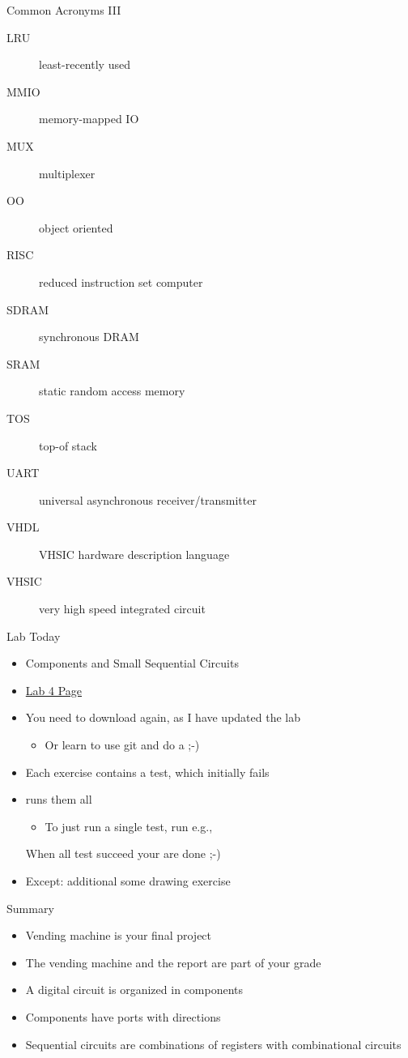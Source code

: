 \begin{frame}[fragile]{Common Acronyms III}
\begin{description}
\item [LRU] least-recently used
\item [MMIO] memory-mapped IO
\item [MUX] multiplexer
\item [OO] object oriented
\item [RISC] reduced instruction set computer
\item [SDRAM] synchronous DRAM
\item [SRAM] static random access memory
\item [TOS] top-of stack
\item [UART] universal asynchronous receiver/transmitter
\item [VHDL] VHSIC hardware description language
\item [VHSIC] very high speed integrated circuit
\end{description}
\end{frame}


\begin{frame}[fragile]{Lab Today}
\begin{itemize}
\item Components and Small Sequential Circuits
\item \href{https://github.com/schoeberl/chisel-lab/tree/master/lab4}{Lab 4 Page}
\item You need to download again, as I have updated the lab
\begin{itemize}
\item Or learn to use git and do a   ;-)
\end{itemize}
\item Each exercise contains a test, which initially fails
\item {} runs them all
\begin{itemize}
\item To just run a single test, run e.g.,\\
\end{itemize}
When all test succeed your are done ;-)
\item Except: additional some drawing exercise
\end{itemize}
\end{frame}

\begin{frame}[fragile]{Summary}
\begin{itemize}
\item Vending machine is your final project
\item The vending machine and the report are part of your grade
\item A digital circuit is organized in components
\item Components have ports with directions
\item Sequential circuits are combinations of registers with combinational circuits
\end{itemize}
\end{frame}

